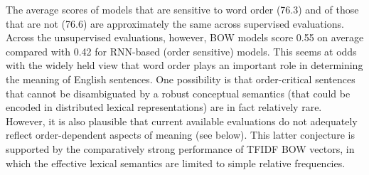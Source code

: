 \documentclass[11pt,letterpaper]{article}
\begin{document}
  
%
%
%
%
%
%


\vspace{5pt} 
The average scores of models that are sensitive to word order (76.3) and of those that are not (76.6) are approximately the same across supervised evaluations. Across the unsupervised evaluations, however, BOW models score 0.55 on average compared with 0.42 for RNN-based (order sensitive) models. This seems at odds with the widely held view that word order plays an important role in determining the meaning of English sentences. One possibility is that order-critical sentences that cannot be disambiguated by a robust conceptual semantics (that could be encoded in distributed lexical representations) are in fact relatively rare. However, it is also plausible that current available evaluations do not adequately reflect order-dependent aspects of meaning (see below). This latter conjecture is supported by the comparatively strong performance of TFIDF BOW vectors, in which the effective lexical semantics are limited to simple relative frequencies.  
\end{document}
